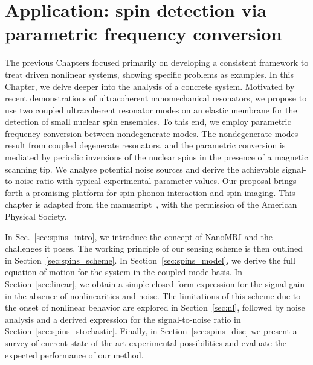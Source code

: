
\chapter{Application: spin detection via parametric frequency conversion} \label{ch:spins}

\begin{chapterabstract}
	The previous Chapters focused primarily on developing a consistent framework to treat driven nonlinear systems, showing specific problems as examples. In this Chapter, we delve deeper into the analysis of a concrete system. Motivated by recent demonstrations of ultracoherent nanomechanical resonators, we propose to use two coupled ultracoherent resonator modes on an elastic membrane for the detection of small nuclear spin ensembles. To this end, we employ parametric frequency conversion between nondegenerate modes. The nondegenerate modes result from	coupled degenerate resonators, and the parametric conversion is mediated by periodic inversions of the nuclear spins in the presence of a magnetic scanning tip. We analyse potential noise sources and derive the achievable signal-to-noise ratio with typical experimental parameter values. Our proposal brings forth a promising platform for spin-phonon interaction and spin imaging.
	\tcblower
	This chapter is adapted from the manuscript~\cite{Kosata_2020}, with the permission of the American Physical Society.
\end{chapterabstract}

In Sec.~\ref{sec:spins_intro}, we introduce the concept of NanoMRI and the challenges it poses. 
The working principle of our sensing scheme is then outlined in Section~\ref{sec:spins_scheme}. In Section~\ref{sec:spins_model}, we derive the full equation of motion for the system in the coupled mode basis. In Section~\ref{sec:linear}, we obtain a simple closed form expression for the signal gain in the absence of nonlinearities and noise. The limitations of this scheme due to the onset of nonlinear behavior are explored in Section~\ref{sec:nl}, followed by noise analysis and a derived expression for the signal-to-noise ratio in Section~\ref{sec:spins_stochastic}. Finally, in Section~\ref{sec:spins_disc} we present a survey of current state-of-the-art experimental possibilities and evaluate the expected performance of our method. 



